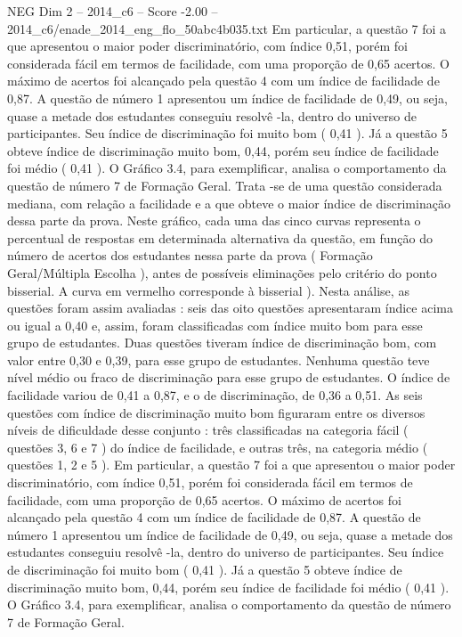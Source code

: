 \begin{textsample}{NEG Dim 2 – 2014\_c6 – Score -2.00 – 2014\_c6/enade\_2014\_eng\_flo\_50abc4b035.txt}
Em particular, a questão 7 foi a que apresentou o maior poder discriminatório, com índice 0,51, porém foi considerada fácil em termos de facilidade, com uma proporção de 0,65 acertos.
O máximo de acertos foi alcançado pela questão 4 com um índice de facilidade de 0,87.
A questão de número 1 apresentou um índice de facilidade de 0,49, ou seja, quase a metade dos estudantes conseguiu resolvê -la, dentro do universo de participantes.
Seu índice de discriminação foi muito bom ( 0,41 ).
Já a questão 5 obteve índice de discriminação muito bom, 0,44, porém seu índice de facilidade foi médio ( 0,41 ).
O Gráfico 3.4, para exemplificar, analisa o comportamento da questão de número 7 de Formação Geral.
Trata -se de uma questão considerada mediana, com relação a facilidade e a que obteve o maior índice de discriminação dessa parte da prova.
Neste gráfico, cada uma das cinco curvas representa o percentual de respostas em determinada alternativa da questão, em função do número de acertos dos estudantes nessa parte da prova ( Formação Geral/Múltipla Escolha ), antes de possíveis eliminações pelo critério do ponto bisserial.
A curva em vermelho corresponde à bisserial ).
Nesta análise, as questões foram assim avaliadas : seis das oito questões apresentaram índice acima ou igual a 0,40 e, assim, foram classificadas com índice muito bom para esse grupo de estudantes.
Duas questões tiveram índice de discriminação bom, com valor entre 0,30 e 0,39, para esse grupo de estudantes.
Nenhuma questão teve nível médio ou fraco de discriminação para esse grupo de estudantes.
O índice de facilidade variou de 0,41 a 0,87, e o de discriminação, de 0,36 a 0,51.
As seis questões com índice de discriminação muito bom figuraram entre os diversos níveis de dificuldade desse conjunto : três classificadas na categoria fácil ( questões 3, 6 e 7 ) do índice de facilidade, e outras três, na categoria médio ( questões 1, 2 e 5 ).
Em particular, a questão 7 foi a que apresentou o maior poder discriminatório, com índice 0,51, porém foi considerada fácil em termos de facilidade, com uma proporção de 0,65 acertos.
O máximo de acertos foi alcançado pela questão 4 com um índice de facilidade de 0,87.
A questão de número 1 apresentou um índice de facilidade de 0,49, ou seja, quase a metade dos estudantes conseguiu resolvê -la, dentro do universo de participantes.
Seu índice de discriminação foi muito bom ( 0,41 ).
Já a questão 5 obteve índice de discriminação muito bom, 0,44, porém seu índice de facilidade foi médio ( 0,41 ).
O Gráfico 3.4, para exemplificar, analisa o comportamento da questão de número 7 de Formação Geral.

\end{textsample}
